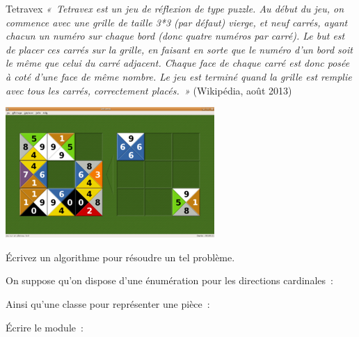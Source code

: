 	\begin{Exercice}{Tetravex}
		\textit{«~Tetravex est un jeu de réflexion de type puzzle. Au début 
		du jeu, on commence avec une grille de taille 3*3 (par défaut) vierge, 
		et neuf carrés, ayant chacun un numéro sur chaque bord (donc quatre 
		numéros par carré). Le but est de	placer ces carrés sur la grille, 
		en faisant en sorte que le numéro d'un bord soit le même que 
		celui du carré adjacent.
		Chaque face de chaque carré est donc posée à coté d'une face 
		de même nombre. Le jeu est terminé quand la grille est
		remplie avec tous les carrés, correctement placés.~»} 
		(Wikipédia, août 2013)

		\begin{center}
			\includegraphics[width=7.938cm,height=4.974cm]{image/Backtracking-img002.png}
		\end{center}
		
		Écrivez un algorithme pour résoudre un tel problème.

		On suppose qu'on dispose d'une énumération pour les directions cardinales~:


		Ainsi qu'une classe pour représenter une pièce~:


		Écrire le module~:

	\end{Exercice}
		
